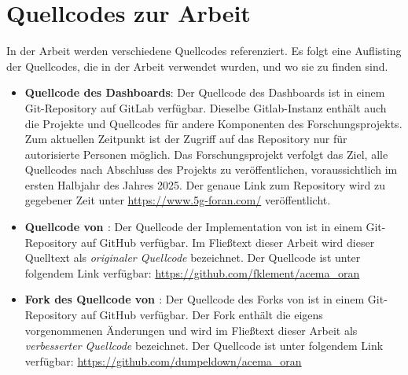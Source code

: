 \chapter{Quellcodes zur Arbeit}
\label{app:sourcecode}
In der Arbeit werden verschiedene Quellcodes referenziert. Es folgt eine Auflisting der Quellcodes, die in der Arbeit verwendet wurden, und wo sie zu finden sind.
\begin{itemize}
    \item \textbf{Quellcode des Dashboards}: Der Quellcode des Dashboards ist in einem Git-Repository auf GitLab verfügbar. Dieselbe Gitlab-Instanz enthält auch die Projekte und Quellcodes für andere Komponenten des Forschungsprojekts. Zum aktuellen Zeitpunkt ist der Zugriff auf das Repository nur für autorisierte Personen möglich. Das Forschungsprojekt verfolgt das Ziel, alle Quellcodes nach Abschluss des Projekts zu veröffentlichen, voraussichtlich im ersten Halbjahr des Jahres 2025. Der genaue Link zum Repository wird zu gegebener Zeit unter \url{https://www.5g-foran.com/} veröffentlicht.
    \item \textbf{Quellcode von \citeauthor{klementSecuring6GTransition2024}}: Der Quellcode der Implementation von \citeauthor{klementSecuring6GTransition2024} ist in einem Git-Repository auf GitHub verfügbar. Im Fließtext dieser Arbeit wird dieser Quelltext als \textit{originaler Quellcode} bezeichnet. Der Quellcode ist unter folgendem Link verfügbar: \url{https://github.com/fklement/acema_oran}
    \item \textbf{Fork des Quellcode von \citeauthor{klementSecuring6GTransition2024}}: Der Quellcode des Forks von \citeauthor{klementSecuring6GTransition2024} ist in einem Git-Repository auf GitHub verfügbar. Der Fork enthält die eigens vorgenommenen Änderungen und wird im Fließtext dieser Arbeit als \textit{verbesserter Quellcode} bezeichnet. Der Quellcode ist unter folgendem Link verfügbar: \url{https://github.com/dumpeldown/acema_oran}
\end{itemize}

\label{app:attack-szenarien}

